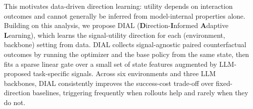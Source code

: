 This motivates data-driven direction learning: utility depends on interaction outcomes and cannot generally be inferred from model-internal properties alone. Building on this analysis, we propose DIAL (\textbf{D}irection-\textbf{I}nformed \textbf{A}daptive \textbf{L}earning), which learns the signal-utility direction for each (environment, backbone) setting from data. DIAL collects signal-agnostic paired counterfactual outcomes by running the optimizer and the base policy from the same state, then fits a sparse linear gate over a small set of state features augmented by LLM-proposed task-specific signals. Across six environments and three LLM backbones, DIAL consistently improves the success-cost trade-off over fixed-direction baselines, triggering frequently when rollouts help and rarely when they do not.
